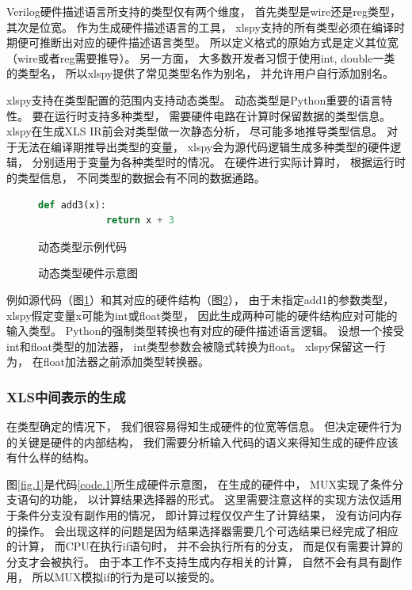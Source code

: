 Verilog硬件描述语言所支持的类型仅有两个维度，
首先类型是wire还是reg类型，
其次是位宽。
作为生成硬件描述语言的工具，
xlspy支持的所有类型必须在编译时期便可推断出对应的硬件描述语言类型。
所以定义格式的原始方式是定义其位宽
（wire或者reg需要推导）。
另一方面，
大多数开发者习惯于使用int, double一类的类型名，
所以xlspy提供了常见类型名作为别名，
并允许用户自行添加别名。

xlspy支持在类型配置的范围内支持动态类型。
动态类型是Python重要的语言特性。
要在运行时支持多种类型，
需要硬件电路在计算时保留数据的类型信息。
xlspy在生成XLS IR前会对类型做一次静态分析，
尽可能多地推导类型信息。
对于无法在编译期推导出类型的变量，
xlspy会为源代码逻辑生成多种类型的硬件逻辑，
分别适用于变量为各种类型时的情况。
在硬件进行实际计算时，
根据运行时的类型信息，
不同类型的数据会有不同的数据通路。

\begin{figure}[h]
    \begin{lstlisting}[language=Python,frame=single]
        def add3(x):
            return x + 3
    \end{lstlisting}
    \caption{动态类型示例代码}
    \label{code.2}
\end{figure}

\begin{figure}[h]
\centering

\caption{动态类型硬件示意图}
\label{fig.2}
\end{figure}

例如源代码（图\ref{code.2}）和其对应的硬件结构（图\ref{fig.2}），
由于未指定add1的参数类型，
xlspy假定变量x可能为int或float类型，
因此生成两种可能的硬件结构应对可能的输入类型。
Python的强制类型转换也有对应的硬件描述语言逻辑。
设想一个接受int和float类型的加法器，
int类型参数会被隐式转换为float。
xlspy保留这一行为，
在float加法器之前添加类型转换器。

\subsubsection{XLS中间表示的生成}

在类型确定的情况下，
我们很容易得知生成硬件的位宽等信息。
但决定硬件行为的关键是硬件的内部结构，
我们需要分析输入代码的语义来得知生成的硬件应该有什么样的结构。

图\ref{fig.1}是代码\ref{code.1}所生成硬件示意图，
在生成的硬件中，
MUX实现了条件分支语句的功能，
以计算结果选择器的形式。
这里需要注意这样的实现方法仅适用于条件分支没有副作用的情况，
即计算过程仅仅产生了计算结果，
没有访问内存的操作。
会出现这样的问题是因为结果选择器需要几个可选结果已经完成了相应的计算，
而CPU在执行if语句时，
并不会执行所有的分支，
而是仅有需要计算的分支才会被执行。
由于本工作不支持生成内存相关的计算，
自然不会有具有副作用，
所以MUX模拟if的行为是可以接受的。

